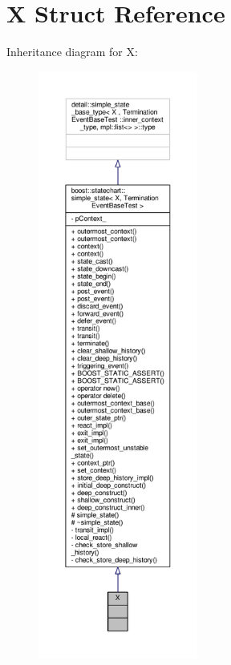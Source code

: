 \hypertarget{struct_x}{}\section{X Struct Reference}
\label{struct_x}


Inheritance diagram for X\+:
\nopagebreak
\begin{figure}[H]
\begin{center}
\leavevmode
\includegraphics[height=550pt]{struct_x__inherit__graph}
\end{center}
\end{figure}


